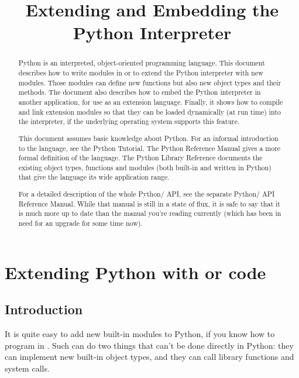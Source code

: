 \documentclass[twoside,openright]{report}
\title{Extending and Embedding the Python Interpreter}
\begin{document}
\pagestyle{empty}

\maketitle



\begin{abstract}

\noindent
Python is an interpreted, object-oriented programming language.  This
document describes how to write modules in \C{} or \Cpp{} to extend the
Python interpreter with new modules.  Those modules can define new
functions but also new object types and their methods.  The document
also describes how to embed the Python interpreter in another
application, for use as an extension language.  Finally, it shows how
to compile and link extension modules so that they can be loaded
dynamically (at run time) into the interpreter, if the underlying
operating system supports this feature.

This document assumes basic knowledge about Python.  For an informal
introduction to the language, see the Python Tutorial.  The Python
Reference Manual gives a more formal definition of the language.  The
Python Library Reference documents the existing object types,
functions and modules (both built-in and written in Python) that give
the language its wide application range.

For a detailed description of the whole Python/\C{} API, see the separate
Python/\C{} API Reference Manual.   While that manual is
still in a state of flux, it is safe to say that it is much more up to
date than the manual you're reading currently (which has been in need
for an upgrade for some time now).


\end{abstract}

\tableofcontents



\chapter{Extending Python with \C{} or \Cpp{} code}


\section{Introduction}

It is quite easy to add new built-in modules to Python, if you know
how to program in \C{}.  Such  can do two things
that can't be done directly in Python: they can implement new built-in
object types, and they can call \C{} library functions and system calls.
\end{document}
